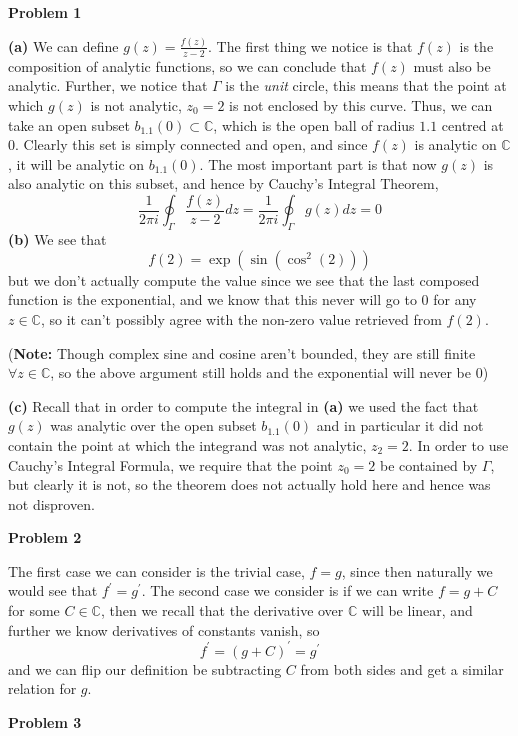 \documentclass[10pt]{article}
\newcommand{\C}{\mathbb{C}}
\begin{document}
\textbf{Problem 1}

\textbf{(a)}
We can define $g(z) = \frac{f(z)}{z-2}$. The first thing we notice is that $f(z)$ is the composition of analytic functions, so we can conclude that $f(z)$ must also be analytic. Further, we notice that $\Gamma$ is the \textit{unit} circle, this means that the point at which $g(z)$ is not analytic, $z_{0} = 2$ is not enclosed by this curve. Thus, we can take an open subset $b_{1.1}(0) \subset \C$, which is the open ball of radius $1.1$ centred at $0$. Clearly this set is simply connected and open, and since $f(z)$ is analytic on $\C$, it will be analytic on $b_{1.1}(0)$. The most important part is that now $g(z)$ is also analytic on this subset, and hence by Cauchy's Integral Theorem,
$$\frac{1}{2\pi i}\oint_{\Gamma}\frac{f(z)}{z -2}dz = \frac{1}{2\pi i}\oint_{\Gamma}g(z)dz = 0$$
\textbf{(b)}
We see that
$$f(2) = \exp(\sin(\cos^{2}(2)))$$
but we don't actually compute the value since we see that the last composed function is the exponential, and we know that this never will go to $0$ for any $z \in \C$, so it can't possibly agree with the non-zero value retrieved from $f(2)$.

(\textbf{Note:} Though complex sine and cosine aren't bounded, they are still finite $\forall z\in \C$, so the above argument still holds and the exponential will never be 0)

\textbf{(c)}
Recall that in order to compute the integral in \textbf{(a)} we used the fact that $g(z)$ was analytic over the open subset $b_{1.1}(0)$ and in particular it did not contain the point at which the integrand was not analytic, $z_{2}=2$. In order to use Cauchy's Integral Formula, we require that the point $z_{0} = 2$ be contained by $\Gamma$, but clearly it is not, so the theorem does not actually hold here and hence was not disproven. 

\textbf{Problem 2}

The first case we can consider is the trivial case, $f=g$, since then naturally we would see that $f^{\prime} = g^{\prime}$. The second case we consider is if we can write $f = g + C$ for some $C\in \C$, then we recall that the derivative over $\C$ will be linear, and further we know derivatives of constants vanish, so
$$f^{\prime} = (g + C)^{\prime} = g^{\prime}$$
and we can flip our definition be subtracting $C$ from both sides and get a similar relation for $g$.

\newpage
\textbf{Problem 3}
\end{document}
